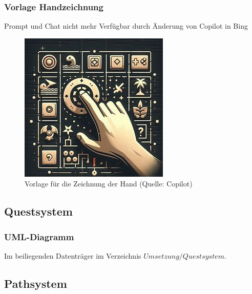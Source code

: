 \documentclass[
	12pt,
	a4paper,
	bibtotoc,
	cleardoubleempty, 
	idxtotoc,
	ngerman,
	openright
	final,
	listof=nochaptergap,
	]{scrbook}
\begin{document}
\begin{appendices}
\subsubsection{Vorlage Handzeichnung}\label{sec:append_realisation_vorlage_handzeichnung}
Prompt und Chat nicht mehr Verfügbar durch Änderung von Copilot in Bing
\begin{figure}[ht]
\centering
\includegraphics[width=1\linewidth]{content/attachments/vorlagen/Vorlage_Hand.jpeg}
\caption{Vorlage für die Zeichnung der Hand (Quelle: Copilot)}
\label{fig:vorlage_hand}
\end{figure}

\subsection{Questsystem}

\subsubsection{UML-Diagramm}\label{sec:append_realisation_uml_quest}
Im beiliegenden Datenträger im Verzeichnis $Umsetzung/Questsystem$. 

\subsection{Pathsystem}


\end{appendices}
\end{document}
